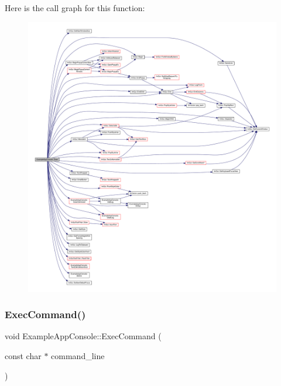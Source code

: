 Here is the call graph for this function\+:
\nopagebreak
\begin{figure}[H]
\begin{center}
\leavevmode
\includegraphics[width=350pt]{struct_example_app_console_a0518a09c7e8648dd52c7c06df19ac17a_cgraph}
\end{center}
\end{figure}
\mbox{\label{struct_example_app_console_aa1e8bf1f3795cbc41597e1ff081c6589}} 
\subsubsection{\texorpdfstring{Exec\+Command()}{ExecCommand()}}
{\footnotesize\ttfamily void Example\+App\+Console\+::\+Exec\+Command (\begin{DoxyParamCaption}\item[{const char $\ast$}]{command\+\_\+line }\end{DoxyParamCaption})\hspace{0.3cm}{\ttfamily [inline]}}


